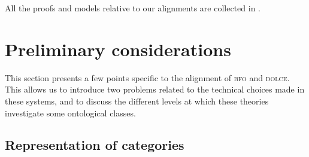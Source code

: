 \documentclass[ao]{iosart2x}
\newcommand{\nb}[1]{\textcolor{red}{$|$}\marginpar{\hspace*{-0cm}\parbox{20mm}{\scriptsize\raggedright\textcolor{red}{#1}}}}
\newcommand{\dolce}{{\textsc{dolce}}}
\newcommand{\bfo}{{\textsc{bfo}}}
\newcommand{\bfoiof}[1]{{\,::_{#1\:\!}}}
\begin{document}
%



All the proofs and models relative to our alignments are collected in \citep{D24}. %

\section{Preliminary considerations}\label{sect_prelim_considerations}
This section presents a few points specific to the alignment of {\bfo} and {\dolce}. This allows us to introduce two problems related to the technical choices made in these systems, and to discuss the different levels at which these theories investigate some ontological classes. 



\subsection{Representation of categories}\label{sect_problem_univ}
\end{document}
